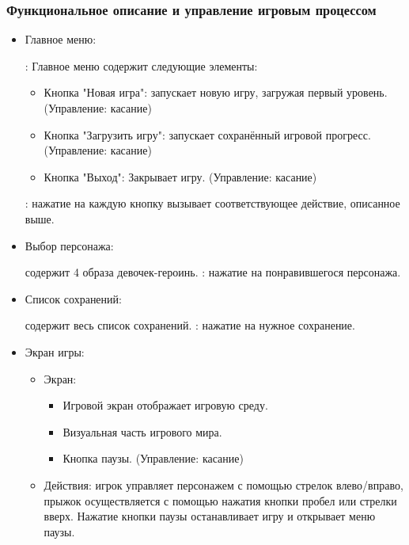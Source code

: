 \documentclass[article,12pt, fleqn]{article}
\begin{document}
\begin{itemize}
\subsubsection{Функциональное описание и управление игровым процессом}
\begin{itemize}
    \item Главное меню:
    \begin{itemize}
        : 
        Главное меню содержит следующие элементы:
        \begin{itemize}
             \item Кнопка "Новая игра": запускает новую игру, загружая первый уровень. (Управление: касание)
             \item Кнопка "Загрузить игру": запускает сохранённый игровой прогресс. (Управление: касание)
            \item Кнопка "Выход": Закрывает игру. (Управление: касание)
        \end{itemize}
        : нажатие на каждую кнопку вызывает соответствующее действие, описанное выше.
    \end{itemize}
    \item Выбор персонажа:
    \begin{itemize}
         содержит 4 образа девочек-героинь.
        : нажатие на понравившегося персонажа.
    \end{itemize}
    \item Список сохранений:
    \begin{itemize}
         содержит весь список сохранений.
        : нажатие на нужное сохранение.
    \end{itemize}
    \item Экран игры:
    \begin{itemize}
        \item Экран: 
        \begin{itemize}
            \item Игровой экран отображает игровую среду.
            \item Визуальная часть игрового мира.
            \item Кнопка паузы. (Управление: касание)
        \end{itemize}
        \item Действия: игрок управляет персонажем с помощью стрелок влево/вправо, прыжок осуществляется с помощью нажатия кнопки пробел или стрелки вверх. Нажатие кнопки паузы останавливает игру и открывает меню паузы.

\end{itemize}
\end{itemize}
\end{itemize}
\end{document}
